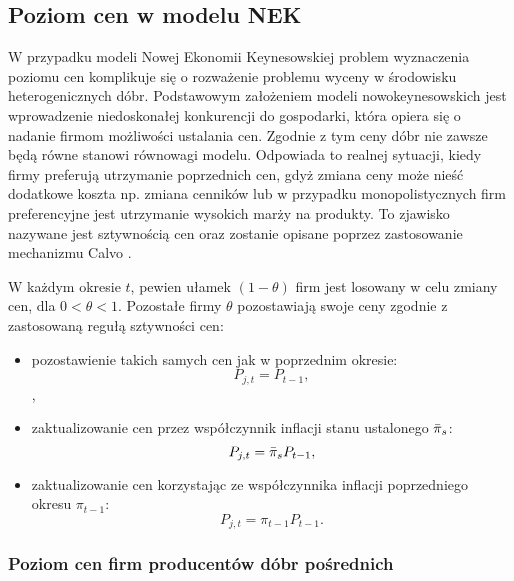\subsection{Poziom cen w modelu NEK}
\label{sec:nek_price_level}

W przypadku modeli Nowej Ekonomii Keynesowskiej problem wyznaczenia poziomu cen komplikuje się o rozważenie problemu wyceny w środowisku heterogenicznych dóbr. Podstawowym założeniem modeli nowokeynesowskich jest wprowadzenie niedoskonałej konkurencji do gospodarki, która opiera się o nadanie firmom możliwości ustalania cen. Zgodnie z tym ceny dóbr nie zawsze będą równe stanowi równowagi modelu. Odpowiada to realnej sytuacji, kiedy firmy preferują utrzymanie poprzednich cen, gdyż zmiana ceny może nieść dodatkowe koszta np. zmiana cenników lub w przypadku monopolistycznych firm preferencyjne jest utrzymanie wysokich marży na produkty. To zjawisko nazywane jest sztywnością cen oraz zostanie opisane poprzez zastosowanie mechanizmu Calvo \cite{CALVO1983383}.

\begin{definition}

W każdym okresie $t$, pewien ułamek $\left( 1 - \theta \right)$ firm  jest losowany w celu zmiany cen, dla $0 < \theta < 1$. Pozostałe firmy $\theta$ pozostawiają swoje ceny zgodnie z zastosowaną regułą sztywności cen:
\begin{itemize}
    \item pozostawienie takich samych cen jak w poprzednim okresie:
    \begin{equation}
        \label{eqn:calvo_first_rule}
        P_{j,t} = P_{t-1},
    \end{equation},
    \item zaktualizowanie cen przez współczynnik inflacji stanu ustalonego $\bar{\pi}_s$:
    \begin{equation}
        P_{j,t} = \bar{\pi}_s P_{t-1},
    \end{equation}
    \item zaktualizowanie cen korzystając ze współczynnika inflacji poprzedniego okresu $\pi_{t-1}$:
    \begin{equation}
        P_{j,t} = \pi_{t-1}P_{t-1}.    
    \end{equation}
\end{itemize}
\end{definition}

\subsubsection{Poziom cen firm producentów dóbr pośrednich}


